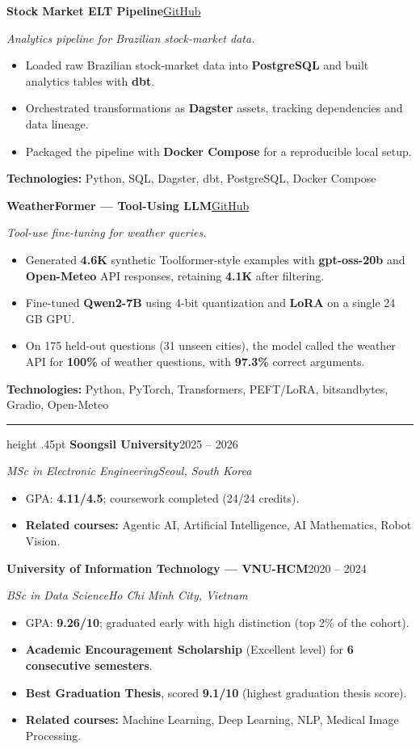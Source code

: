 \documentclass[11pt,a4paper]{article}
\newcommand{\secname}[1]{\vspace{12pt}\Needspace{4\baselineskip}{\normalsize\bfseries\MakeUppercase{#1}}\par\vspace{2pt}\hrule height .45pt\vspace{5pt}}
\newcommand{\entry}[4]{\Needspace{3\baselineskip}\textbf{#1}\hfill {\small #2}\par\textit{#3}\hfill\textit{\small #4}\par}
\newcommand{\proj}[3]{\Needspace{3\baselineskip}\textbf{#1}\hfill\href{#2}{\small GitHub}\par\vspace{1pt}\textit{#3}\par}
\newcommand{\ts}[1]{\textbf{Technologies:} #1}
\begin{document}
\proj{Stock Market ELT Pipeline}{https://github.com/Tam1032/ELT-Pipeline-Brazillian-stock}{Analytics pipeline for Brazilian stock-market data.}
\begin{itemize}
    \item Loaded raw Brazilian stock-market data into \textbf{PostgreSQL} and built analytics tables with \textbf{dbt}.
    \item Orchestrated transformations as \textbf{Dagster} assets, tracking dependencies and data lineage.
    \item Packaged the pipeline with \textbf{Docker Compose} for a reproducible local setup.
\end{itemize}
{\small\ts{Python, SQL, Dagster, dbt, PostgreSQL, Docker Compose}}\par
\vspace{9pt}

\proj{WeatherFormer --- Tool-Using LLM}{https://github.com/Tam1032/WeatherFormer}{Tool-use fine-tuning for weather queries.}
\begin{itemize}
    \item Generated \textbf{4.6K} synthetic Toolformer-style examples with \textbf{gpt-oss-20b} and \textbf{Open-Meteo} API responses, retaining \textbf{4.1K} after filtering.
    \item Fine-tuned \textbf{Qwen2-7B} using 4-bit quantization and \textbf{LoRA} on a single 24 GB GPU.
    \item On 175 held-out questions (31 unseen cities), the model called the weather API for \textbf{100\%} of weather questions, with \textbf{97.3\%} correct arguments.
\end{itemize}
{\small\ts{Python, PyTorch, Transformers, PEFT/LoRA, bitsandbytes, Gradio, Open-Meteo}}\par

\secname{Education}
\entry{Soongsil University}{2025 -- 2026}{MSc in Electronic Engineering}{Seoul, South Korea}
\begin{itemize}
\item GPA: \textbf{4.11/4.5}; coursework completed (24/24 credits).
\item \textbf{Related courses:} Agentic AI, Artificial Intelligence, AI Mathematics, Robot Vision.
\end{itemize}
\vspace{2pt}
\entry{University of Information Technology --- VNU-HCM}{2020 -- 2024}{BSc in Data Science}{Ho Chi Minh City, Vietnam}
\begin{itemize}
\item GPA: \textbf{9.26/10}; graduated early with high distinction (top 2\% of the cohort).
\item \textbf{Academic Encouragement Scholarship} (Excellent level) for \textbf{6 consecutive semesters}.
\item \textbf{Best Graduation Thesis}, scored \textbf{9.1/10} (highest graduation thesis score).
\item \textbf{Related courses:} Machine Learning, Deep Learning, NLP, Medical Image Processing.
\end{itemize}
\end{document}
